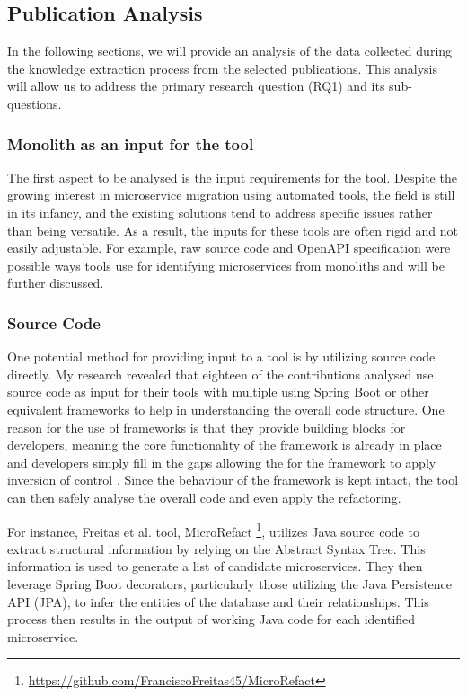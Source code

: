 \documentclass[conference]{IEEEtran}
\begin{document}
\subsection{Publication Analysis}

In the following sections, we will provide an analysis of the data collected
during the knowledge extraction process from the selected publications. This
analysis will allow us to address the primary research question (RQ1) and its
sub-questions.

\subsubsection{Monolith as an input for the tool}

The first aspect to be analysed is the input requirements for the tool. Despite
the growing interest in microservice migration using automated tools, the field
is still in its infancy, and the existing solutions tend to address specific
issues rather than being versatile. As a result, the inputs for these tools are
often rigid and not easily adjustable. For example, raw source code and OpenAPI
specification were possible ways tools use for identifying microservices from
monoliths and will be further discussed.

\subsubsection*{Source Code}

One potential method for providing input to a tool is by utilizing source code
directly. My research revealed that eighteen of the contributions analysed use
source code as input for their tools with multiple using Spring Boot or other
equivalent frameworks to help in understanding the overall code structure. One
reason for the use of frameworks is that they provide building blocks for
developers, meaning the core functionality of the framework is already in place
and developers simply fill in the gaps allowing the for the framework to apply
inversion of control \cite{gamma1995design}. Since the behaviour of the
framework is kept intact, the tool can then safely analyse the overall code and
even apply the refactoring.

For instance, Freitas et al.  tool, MicroRefact
\footnote{\url{https://github.com/FranciscoFreitas45/MicroRefact}}, utilizes
Java source code to extract structural information by relying on the Abstract
Syntax Tree. This information is used to generate a list of candidate
microservices. They then leverage Spring Boot decorators, particularly those
utilizing the Java Persistence API (JPA), to infer the entities of the database
and their relationships. This process then results in the output of working
Java code for each identified microservice.
\end{document}
